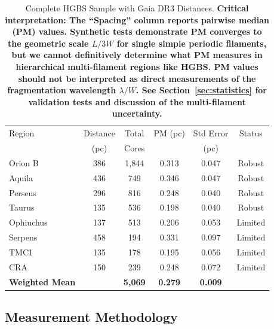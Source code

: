 \documentclass[twoside,twocolumn]{mnras}
\begin{document}
\begin{table}
\caption{Complete HGBS Sample with Gaia DR3 Distances. \textbf{Critical interpretation: The ``Spacing'' column reports pairwise median (PM) values. Synthetic tests demonstrate PM converges to the geometric scale $L/3W$ for \textbf{single simple periodic filaments}, but we cannot definitively determine what PM measures in hierarchical multi-filament regions like HGBS. PM values should not be interpreted as direct measurements of the fragmentation wavelength $\lambda/W$. See Section~\ref{sec:statistics} for validation tests and discussion of the multi-filament uncertainty.}}
\label{tab:sample}
\begin{tabular}{lccccc}
\toprule
Region & Distance & Total & PM (pc) & Std Error & Status \\
       & (pc)   & Cores & & (pc)      &  \\
\midrule
Orion B  & 386 & 1,844 & 0.313 & 0.047 & Robust \\
Aquila   & 436 & 749   & 0.346 & 0.047 & Robust \\
Perseus  & 296 & 816   & 0.248 & 0.040 & Robust \\
Taurus   & 135 & 536   & 0.198 & 0.040 & Robust \\
Ophiuchus& 137 & 513   & 0.206 & 0.053 & Limited \\
Serpens  & 458 & 194   & 0.331 & 0.097 & Limited \\
TMC1     & 135 & 178   & 0.195 & 0.056 & Limited \\
CRA      & 150 & 239   & 0.248 & 0.072 & Limited \\
\midrule
\textbf{Weighted Mean} &  & \textbf{5,069} & \textbf{0.279} & \textbf{0.009} &  \\
\bottomrule
\end{tabular}
\end{table}

\subsection{Measurement Methodology}
\end{document}
